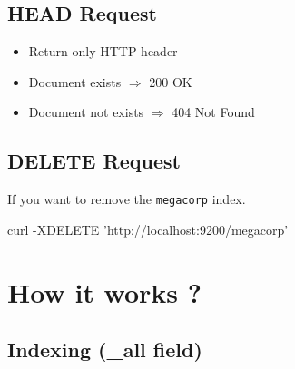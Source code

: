 \documentclass[]{beamer}
\begin{document}
\subsection{HEAD Request}

\begin{frame}{\subsecname{}}
  \begin{itemize}
    \item Return only HTTP header
    \item Document exists $\Rightarrow$ 200 OK
    \item Document not exists $\Rightarrow$ 404 Not Found
  \end{itemize}
\end{frame}

\subsection{DELETE Request}

\begin{frame}[containsverbatim]{\subsecname{}}
  If you want to remove the \texttt{megacorp} index.

  \begin{command}
curl -XDELETE 'http://localhost:9200/megacorp'
  \end{command}
\end{frame}

\section{How it works ?}

\subsection{Indexing (\_all field)}
\end{document}
